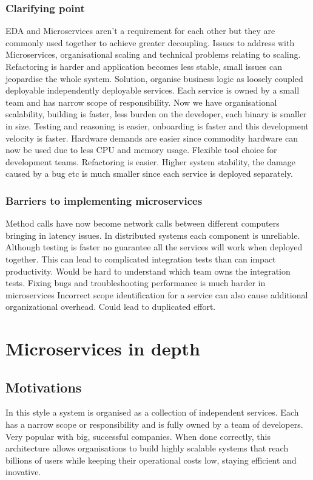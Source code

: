 \documentclass[a4paper, 11pt]{book}
\begin{document}
    \subsection{Clarifying point} EDA and Microservices aren't a requirement for each other but they are commonly used together to achieve greater decoupling.
    Issues to address with Microservices, organisational scaling and technical problems relating to scaling.
    Refactoring is harder and application becomes less stable, small issues can jeopardise the whole system.
    Solution, organise business logic as loosely coupled deployable independently deployable services.
    Each service is owned by a small team and has narrow scope of responsibility.
    Now we have organisational scalability, building is faster, less burden on the developer, each binary is smaller in size.
    Testing and reasoning is easier, onboarding is faster and this development velocity is faster.
    Hardware demands are easier since commodity hardware can now be used due to less CPU and memory usage.
    Flexible tool choice for development teams.
    Refactoring is easier.
    Higher system stability, the damage caused by a bug etc is much smaller since each service is deployed separately.

    \subsection{Barriers to implementing microservices}
    Method calls have now become network calls between different computers bringing in latency issues.
    In distributed systems each component is unreliable.
    Although testing is faster no guarantee all the services will work when deployed together.
    This can lead to complicated integration tests than can impact productivity.
    Would be hard to understand which team owns the integration tests.
    Fixing bugs and troubleshooting performance is much harder in microservices
    Incorrect scope identification for a service can also cause additional organizational overhead.
    Could lead to duplicated effort.

    \chapter{Microservices in depth}

    \section{Motivations}
    In this style a system is organised as a collection of independent services.
    Each has a narrow scope or responsibility and is fully owned by a team of developers.
    Very popular with big, successful companies.
    When done correctly, this architecture allows organisations to build highly scalable systems that reach billions of users while keeping their operational costs low, staying efficient and inovative.
\end{document}
